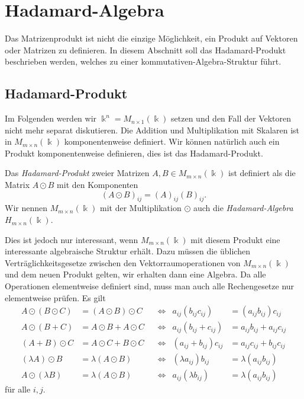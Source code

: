 %
%
%
\section{Hadamard-Algebra
\label{buch:section:hadamard-algebra}}
Das Matrizenprodukt ist nicht die einzige Möglichkeit, ein Produkt auf
Vektoren oder Matrizen zu definieren.
In diesem Abschnitt soll das Hadamard-Produkt beschrieben werden,
welches zu einer kommutativen-Algebra-Struktur führt.

%
%
\subsection{Hadamard-Produkt
\label{buch:vektorenmatrizen:subsection:hadamard-produkt}}
Im Folgenden werden wir $\Bbbk^n =M_{n\times 1}(\Bbbk)$ setzen
und den Fall der Vektoren nicht mehr separat diskutieren.
Die Addition und Multiplikation mit Skalaren ist in 
$M_{m\times n}(\Bbbk)$ komponentenweise definiert.
Wir können natürlich auch ein Produkt komponentenweise definieren,
dies ist das Hadamard-Produkt.

\begin{definition}
Das {\em Hadamard-Produkt} zweier Matrizen
%
$A,B\in M_{m\times n}(\Bbbk)$ ist definiert als die Matrix
$A\odot B$ 
mit den Komponenten
\[
(A\odot B)_{i\!j} = (A)_{i\!j} (B)_{i\!j}.
\]
Wir nennen $M_{m\times n}(\Bbbk)$ mit der Multiplikation $\odot$ 
auch die {\em Hadamard-Algebra} $H_{m\times n}(\Bbbk)$.
%
\end{definition}

Dies ist jedoch nur interessant, wenn $M_{m\times n}(\Bbbk)$ mit diesem
Produkt eine interessante algebraische Struktur erhält.
Dazu müssen die üblichen Verträglichkeitsgesetze zwischen den
Vektorraumoperationen von $M_{m\times n}(\Bbbk)$ und dem neuen Produkt
gelten, wir erhalten dann eine Algebra.
Da alle Operationen elementweise definiert sind, muss man auch alle
Rechengesetze nur elementweise prüfen.
Es gilt
\begin{align*}
A\odot(B\odot C) &= (A\odot B)\odot C
&&\Leftrightarrow&
a_{i\!j}(b_{i\!j}c_{i\!j}) &= (a_{i\!j}b_{i\!j})c_{i\!j}
\\
A\odot(B+C) &= A\odot B + A\odot C
&&\Leftrightarrow&
a_{i\!j}(b_{i\!j}+c_{i\!j}) &= a_{i\!j}b_{i\!j} + a_{i\!j}c_{i\!j}
\\
(A+B)\odot C&=A\odot C+B\odot C
&&\Leftrightarrow&
(a_{i\!j}+b_{i\!j})c_{i\!j}&=a_{i\!j}c_{i\!j} + b_{i\!j}c_{i\!j}
\\
(\lambda A)\odot B &= \lambda (A\odot B)
&&\Leftrightarrow&
(\lambda a_{i\!j})b_{i\!j}&=\lambda(a_{i\!j}b_{i\!j})
\\
A\odot(\lambda B)&=\lambda(A\odot B)
&&\Leftrightarrow&
a_{i\!j}(\lambda b_{i\!j})&=\lambda(a_{i\!j}b_{i\!j})
\end{align*}
für alle $i,j$.

